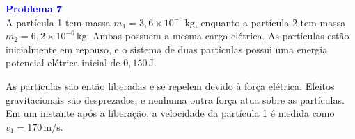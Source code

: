 \documentclass[a4paper,12pt]{article}
\begin{document}
\begin{flushleft}
\textbf{\textcolor{blue}{\Large Problema 7}}\\
A partícula 1 tem massa \( m_1 = 3{,}6 \times 10^{-6} \, \text{kg} \), enquanto a partícula 2 tem 
massa \( m_2 = 6{,}2 \times 10^{-6} \, \text{kg} \). Ambas possuem a mesma carga elétrica. As partículas 
estão inicialmente em repouso, e o sistema de duas partículas possui uma energia potencial elétrica 
inicial de \( 0{,}150 \, \text{J} \).

As partículas são então liberadas e se repelem devido à força elétrica. Efeitos gravitacionais 
são desprezados, e nenhuma outra força atua sobre as partículas. Em um instante após a liberação, a 
velocidade da partícula 1 é medida como \( v_1 = 170 \, \text{m/s} \).

\begin{center}
\end{center}
\end{flushleft}
\end{document}
